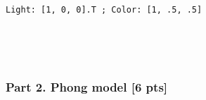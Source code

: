 \documentclass[11pt]{article}
\begin{document}
    \begin{center}
    \end{center}
    { \hspace*{\fill} \\}
    
    \begin{Verbatim}[commandchars=\\\{\}]
Light: [1, 0, 0].T ; Color: [1, .5, .5]

    \end{Verbatim}

    \begin{center}
    \end{center}
    { \hspace*{\fill} \\}
    
    \begin{center}
    \end{center}
    { \hspace*{\fill} \\}
    
    \subsubsection{Part 2. Phong model {[}6
pts{]}}\label{part-2.-phong-model-6-pts}
\end{document}
